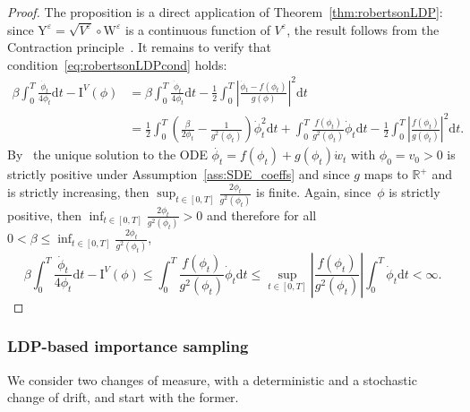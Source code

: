 \documentclass{amsart}[11pt]
\numberwithin{equation}{section}
\numberwithin{theorem}{subsection}
\numberwithin{proposition}{subsection}
\numberwithin{definition}{subsection}
\numberwithin{lemma}{subsection}
\numberwithin{assumption}{subsection}
\newcommand{\RR}{\mathbb{R}}
\newcommand{\R}{\RR}
\newcommand{\Wf}{\boldsymbol{\mathrm{W}}}
\newcommand{\Yf}{\boldsymbol{\mathrm{Y}}}
\newcommand{\D}{\mathrm{d}}
\newcommand{\IIV}{\mathrm{I}^{V}}
\newcommand{\eps}{\varepsilon}
\begin{document}
\begin{proof}
The proposition is a direct application of Theorem~\ref{thm:robertsonLDP}:
since $\Yf^{\eps} = \sqrt{V^{\eps}}\circ\Wf^\eps$ is a continuous function of $V^\eps$, the result follows from the Contraction principle~\cite[Theorem~4.2.1]{Dembo2010}. 
It remains to verify that condition~\eqref{eq:robertsonLDPcond} holds:
\begin{align*}
\beta\int_0^T\frac{\dot{\phi}_t}{4\phi_t}\D t - \IIV(\phi) &= \beta\int_0^T\frac{\dot{\phi}_t}{4\phi_t}\D t - \frac{1}{2}\int_0^T\left|\frac{\dot{\phi}_t-f(\phi_t)}{g(\phi)} \right|^2 \D t \\ &= \frac{1}{2}\int_0^T \left( \frac{\beta}{2\phi_t} - \frac{1}{g^2(\phi_t)} \right ) \dot{\phi}_t^2 \D t + \int_0^T \frac{f(\phi_t)}{g^2(\phi_t)}\dot{\phi}_t\D t - \frac{1}{2}\int_0^T \left | \frac{f(\phi_t)}{g(\phi_t)} \right |^2 \D t.
\end{align*}
By~\cite[Proposition 3.11]{Baldi2011} the unique solution to the ODE $\dot{\phi_t}=f(\phi_t)+g(\phi_t)\dot{w}_t$ with $\phi_0 = v_0 > 0$ is strictly positive under Assumption~\ref{ass:SDE_coeffs} and since $g$ maps to $\R^+$ and is strictly increasing, 
then $\sup_{t\in[0,T]} \frac{2\phi_t}{g^2(\phi_t)}$ is finite.
Again, since~$\phi$ is strictly positive, then $\inf_{t\in[0,T]}\frac{2\phi_t}{g^2(\phi_t)}>0$ 
and therefore for all $0<\beta\leq\inf_{t\in[0,T]}\frac{2\phi_t}{g^2(\phi_t)}$,
$$
\beta\int_0^T\frac{\dot{\phi}_t}{4\phi_t}\D t - \IIV(\phi) 
\leq \int_0^T \frac{f(\phi_t)}{g^2(\phi_t)}\dot{\phi}_t \D t 
\leq \sup_{t\in[0,T]}\left |  \frac{f(\phi_t)}{g^2(\phi_t)} \right | \int_0^T \dot{\phi}_t \D t
< \infty.
$$
\end{proof}

\subsubsection{LDP-based importance sampling}
We consider two changes of measure, with a deterministic and a stochastic change of drift,
and start with the former.
\end{document}
